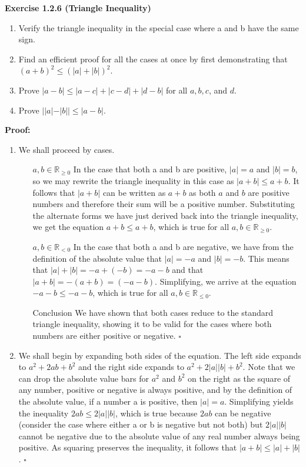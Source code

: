 \documentclass[12 pt]{article}
\newcommand{\qed}[0]{$\square$}
\begin{document}
\newpage

\textbf{Exercise 1.2.6 (Triangle Inequality)}
\begin{enumerate}
\item Verify the triangle inequality in the special case where a and b have the same sign.
\item Find an efficient proof for all the cases at once by first demonstrating that $(a+b)^2 \leq (|a|+|b|)^2$.
\item Prove $|a-b| \leq |a-c| + |c-d| + |d-b|$ for all $a, b,c$, and $d$.
\item Prove $||a|-|b|| \leq |a-b|$.
\end{enumerate}

\vspace{5mm}

\textbf{Proof:}
\begin{enumerate}
\item We shall proceed by cases. 
\begin{enumerate}
\item[\(a,b \in \mathbb{R}_{\geq 0}\)] In the case that both a and b are positive, \(|a| = a\) and \(|b| = b\), so we may rewrite the triangle inequality in this case as  \(|a + b| \leq a + b\). It follows that \(|a + b|\) can be written as \(a + b\) as both \(a\) and \(b\) are positive numbers and therefore their sum will be a positive number. Substituting the alternate forms we have just derived back into the triangle inequality, we get the equation \(a + b \leq a + b\), which is true for all \(a, b \in \mathbb{R}_{\geq 0}\). 
\item[\(a,b \in \mathbb{R}_{< 0}\)] In the case that both a and b are negative, we have from the definition of the absolute value that \(|a| = -a\) and \(|b| = -b\). This means that \(|a| + |b| = -a + (-b) = -a - b\) and that \(|a+b|= -(a+b) = (-a - b)\). Simplifying, we arrive at the equation \(-a -b \leq -a - b\), which is true for all \(a, b \in \mathbb{R}_{\leq 0}\).
\item[Conclusion] We have shown that both cases reduce to the standard triangle inequality, showing it to be valid for the cases where both numbers are either positive or negative. \qed 
\end{enumerate}

\item We shall begin by expanding both sides of the equation. The left side expands to $a^2 + 2ab + b^2$ and the right side expands to \(a^2 + 2|a||b| + b^2\). Note that we can drop the absolute value bars for \(a^2\) and \(b^2\) on the right as the square of any number, positive or negative is always positive, and by the definition of the absolute value, if a number a is positive, then \(|a| = a\). Simplifying yields the inequality \(2ab \leq 2|a||b|\), which is true because \(2ab\) can be negative (consider the case where either a or b is negative but not both) but \(2|a||b|\) cannot be negative due to the absolute value of any real number always being positive. As squaring preserves the inequality, it follows that \(|a + b| \leq |a| + |b|\). \qed


\end{enumerate}
\end{document}
